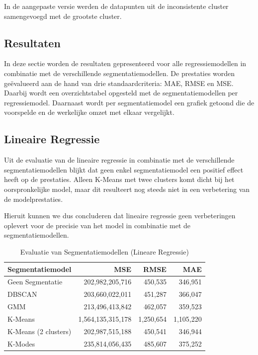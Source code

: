 In de aangepaste versie werden de datapunten uit de inconsistente cluster samengevoegd met de grootste cluster.

\subsection{Resultaten}

In deze sectie worden de resultaten gepresenteerd voor alle regressiemodellen in combinatie met de verschillende segmentatiemodellen. De prestaties worden geëvalueerd aan de hand van drie standaardcriteria: MAE, RMSE en MSE. Daarbij wordt een overzichtstabel opgesteld met de segmentatiemodellen per regressiemodel. Daarnaast wordt per segmentatiemodel een grafiek getoond die de voorspelde en de werkelijke omzet met elkaar vergelijkt.


\subsection*{Lineaire Regressie}

Uit de evaluatie van de lineaire regressie in combinatie met de verschillende segmentatiemodellen blijkt dat geen enkel segmentatiemodel een positief effect heeft op de prestaties. Alleen K-Means met twee clusters komt dicht bij het oorspronkelijke model, maar dit resulteert nog steeds niet in een verbetering van de modelprestaties.

\vspace{1em}

Hieruit kunnen we dus concluderen dat lineaire regressie geen verbeteringen oplevert voor de precisie van het model in combinatie met de segmentatiemodellen.

\begin{table}[H]
    \centering
    \caption{Evaluatie van Segmentatiemodellen (Lineare Regressie)}
    \label{tab:segmentation_model_evaluation}
    \begin{tabular}{|l|r|r|r|}
        \hline
        \textbf{Segmentatiemodel} & \textbf{MSE} & \textbf{RMSE} & \textbf{MAE} \\ \hline
        Geen Segmentatie         & 202,982,205,716 & 450,535 & 346,951  \\ \hline
        DBSCAN                   & 203,660,022,011 & 451,287 & 366,047 \\ \hline
        GMM                      & 213,496,413,842 & 462,057 & 359,523 \\ \hline
        K-Means                  & 1,564,135,315,178 & 1,250,654 & 1,105,220 \\ \hline
        K-Means (2 clusters)     & 202,987,515,188 & 450,541 & 346,944 \\ \hline
        K-Modes                  & 235,814,056,435 & 485,607 & 375,252 \\ \hline
    \end{tabular}
\end{table}

